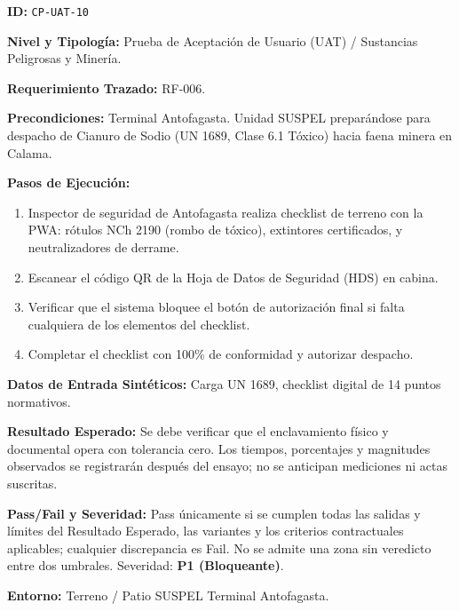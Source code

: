 \par\noindent\textbf{ID:} \texttt{C\allowbreak{}P\allowbreak{}-\allowbreak{}U\allowbreak{}A\allowbreak{}T\allowbreak{}-\allowbreak{}1\allowbreak{}0\allowbreak{}}\par
\par\noindent\textbf{Nivel y Tipología:} Prueba de Aceptación de Usuario (UAT) / Sustancias Peligrosas y Minería.\par
\par\noindent\textbf{Requerimiento Trazado:} RF-006.\par
\par\noindent\textbf{Precondiciones:} Terminal Antofagasta. Unidad SUSPEL preparándose para despacho de Cianuro de Sodio (UN 1689, Clase 6.1 Tóxico) hacia faena minera en Calama.\par
\par\noindent\textbf{Pasos de Ejecución:} \par
\begin{enumerate}
\item Inspector de seguridad de Antofagasta realiza checklist de terreno con la PWA: rótulos NCh 2190 (rombo de tóxico), extintores certificados, y neutralizadores de derrame.
\item Escanear el código QR de la Hoja de Datos de Seguridad (HDS) en cabina.
\item Verificar que el sistema bloquee el botón de autorización final si falta cualquiera de los elementos del checklist.
\item Completar el checklist con 100\% de conformidad y autorizar despacho.
\end{enumerate}
\par\noindent\textbf{Datos de Entrada Sintéticos:} Carga UN 1689, checklist digital de 14 puntos normativos.\par
\par\noindent\textbf{Resultado Esperado:} Se debe verificar que el enclavamiento físico y documental opera con tolerancia cero. Los tiempos, porcentajes y magnitudes observados se registrarán después del ensayo; no se anticipan mediciones ni actas suscritas.\par
\par\noindent\textbf{Pass/Fail y Severidad:} Pass únicamente si se cumplen todas las salidas y límites del Resultado Esperado, las variantes y los criterios contractuales aplicables; cualquier discrepancia es Fail. No se admite una zona sin veredicto entre dos umbrales. Severidad: \textbf{P1 (Bloqueante)}.\par
\par\noindent\textbf{Entorno:} Terreno / Patio SUSPEL Terminal Antofagasta.\par






